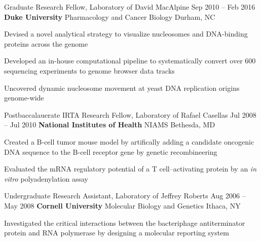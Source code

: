 
\begin{resentries}

  \resentry
    {Graduate Research Fellow, Laboratory of David MacAlpine}
    {Sep 2010 -- Feb 2016}
    {\textbf{Duke University} \xspace \bullet \xspace \xspace Pharmacology and Cancer Biology} %
    {Durham, NC} %
    {
      \begin{cvitems} %
        \item{Devised a novel analytical strategy to visualize nucleosomes and DNA-binding proteins across the genome}
        \item{Developed an in-house computational pipeline to systematically convert over 600 sequencing experiments to genome browser data tracks}
        \item{Uncovered dynamic nucleosome movement at yeast DNA replication origins genome-wide} 
      \end{cvitems}
    }

  \resentry
    {Postbaccalauerate IRTA Research Fellow, Laboratory of Rafael Casellas}
    {Jul 2008 -- Jul 2010}
    {\textbf{National Institutes of Health} \xspace \bullet \xspace \xspace NIAMS}
    {Bethesda, MD}
    {
      \begin{cvitems} %
        \item{Created a B-cell tumor mouse model by artifically adding a candidate oncogenic DNA sequence to the B-cell receptor gene by genetic recombineering}
        \item{Evaluated the mRNA regulatory potential of a T cell--activating protein by an \textit{in vitro} polyadenylation assay}
      \end{cvitems}
    }

  \resentry
    {Undergraduate Research Assistant, Laboratory of Jeffrey Roberts}
    {Aug 2006 -- May 2008}
    {\textbf{Cornell University} \xspace \bullet \xspace \xspace Molecular Biology and Genetics}
    {Ithaca, NY}
    {
      \begin{cvitems} %
        \item{Investigated the critical interactions between the bacteriphage antiterminator protein and RNA polymerase by designing a molecular reporting system}
      \end{cvitems}
    }

\end{resentries}
\vspace{-2mm}
